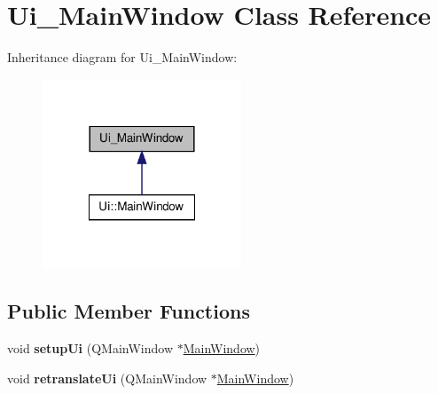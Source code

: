 \hypertarget{class_ui___main_window}{\section{\-Ui\-\_\-\-Main\-Window \-Class \-Reference}
\label{class_ui___main_window}
}


\-Inheritance diagram for \-Ui\-\_\-\-Main\-Window\-:
\nopagebreak
\begin{figure}[H]
\begin{center}
\leavevmode
\includegraphics[width=168pt]{class_ui___main_window__inherit__graph}
\end{center}
\end{figure}
\subsection*{\-Public \-Member \-Functions}
\begin{DoxyCompactItemize}
\item 
\hypertarget{class_ui___main_window_acf4a0872c4c77d8f43a2ec66ed849b58}{void {\bfseries setup\-Ui} (\-Q\-Main\-Window $\ast$\hyperlink{class_main_window}{\-Main\-Window})}\label{class_ui___main_window_acf4a0872c4c77d8f43a2ec66ed849b58}

\item 
\hypertarget{class_ui___main_window_a097dd160c3534a204904cb374412c618}{void {\bfseries retranslate\-Ui} (\-Q\-Main\-Window $\ast$\hyperlink{class_main_window}{\-Main\-Window})}\label{class_ui___main_window_a097dd160c3534a204904cb374412c618}

\end{DoxyCompactItemize}
